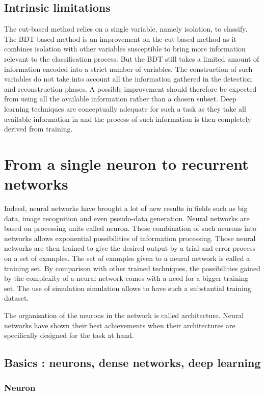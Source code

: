 \subsection{Intrinsic limitations}

The cut-based method relies on a single variable, namely isolation, to classify. The BDT-based method is an improvement on the cut-based method as it combines isolation with other variables susceptible to bring more information relevant to the classification process. But the BDT still takes a limited amount of information encoded into a strict number of variables. The construction of such variables do not take into account all the information gathered in the detection and reconstruction phases. A possible improvement should therefore be expected from using all the available information rather than a chosen subset. Deep learning techniques are conceptually adequate for such a task as they take all available information in and the process of such information is then completely derived from training.


\section{From a single neuron to recurrent networks}
\label{sec:NN}
Indeed, neural networks have brought a lot of new results in fields such as big data, image recognition and even pseudo-data generation.
Neural networks are based on processing units called neuron. These combination of such neurons into networks allows exponential possibilities of information processing. Those neural networks are then trained to give the desired output by a trial and error process on a set of examples. The set of examples given to a neural network is called a training set. By comparison with other trained techniques, the possibilities gained by the complexity of a neural network comes with a need for a bigger training set. The use of simulation simulation allows to have such a substantial training dataset.

The organisation of the neurons in the network is called architecture. Neural networks have shown their best achievements when their architectures are specifically designed for the task at hand.

\subsection{Basics : neurons, dense networks, deep learning}

\subsubsection{Neuron}

